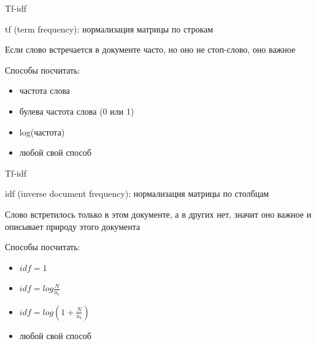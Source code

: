 \documentclass[notes,12pt, aspectratio=169]{beamer}
\newenvironment{wideitemize}{\itemize\addtolength{\itemsep}{10pt}}{\enditemize}
\begin{document}
\begin{frame}{Tf-idf}
	\begin{wideitemize} 
		\item  \alert{tf (term frequency):} нормализация матрицы по строкам
		
		\item Если слово встречается в документе часто, но оно не стоп-слово, оно важное
		
		\item  Способы посчитать: 
		\begin{itemize}
			\item  частота слова 
			
			\item  булева частота слова (0 или 1)
			
			\item  log(частота)
			
			\item  любой свой способ
		\end{itemize}
	\end{wideitemize}
\end{frame} 


\begin{frame}{Tf-idf}
	\begin{wideitemize} 
		\item  \alert{idf (inverse document frequency):} нормализация матрицы по столбцам
		
		\item Слово встретилось только в этом документе, а в других нет, значит оно важное и описывает природу этого документа
		
		\item  Способы посчитать: 
		\begin{itemize}
			\item  $idf = 1$
			
			\item  $idf = log  \frac{N}{n_t}$
			
			\item  $idf = log \left(1 +  \frac{N}{n_t} \right)$
			
			\item  любой свой способ
		\end{itemize}
	\end{wideitemize}
\end{frame} 
\end{document}
